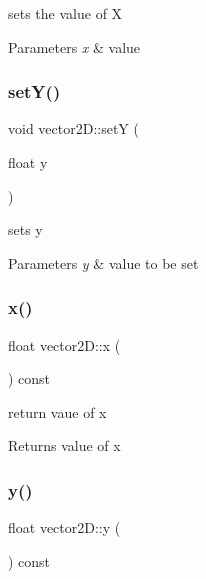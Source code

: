 sets the value of X 


\begin{DoxyParams}{Parameters}
{\em x} & value \\
\hline
\end{DoxyParams}
\mbox{\label{classvector2_d_a265f654087406a71b586430c2698f5ec}} 
\subsubsection{\texorpdfstring{set\+Y()}{setY()}}
{\footnotesize\ttfamily void vector2\+D\+::setY (\begin{DoxyParamCaption}\item[{float}]{y }\end{DoxyParamCaption})}



sets y 


\begin{DoxyParams}{Parameters}
{\em y} & value to be set \\
\hline
\end{DoxyParams}
\mbox{\label{classvector2_d_a5a10d60e8f3329a93788aeee486afcb1}} 
\subsubsection{\texorpdfstring{x()}{x()}}
{\footnotesize\ttfamily float vector2\+D\+::x (\begin{DoxyParamCaption}{ }\end{DoxyParamCaption}) const}



return vaue of x 

\begin{DoxyReturn}{Returns}
value of x 
\end{DoxyReturn}
\mbox{\label{classvector2_d_abe3fccbcc8141dc83e7597fd4564380f}} 
\subsubsection{\texorpdfstring{y()}{y()}}
{\footnotesize\ttfamily float vector2\+D\+::y (\begin{DoxyParamCaption}{ }\end{DoxyParamCaption}) const}



